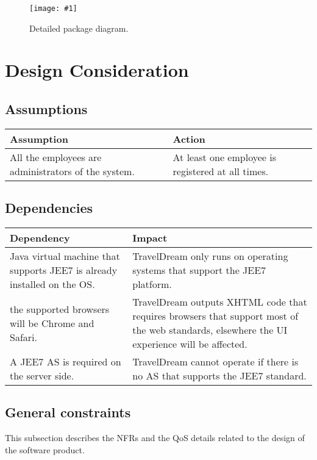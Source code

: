 \documentclass[a4paper,12pt]{book}
\newcommand{\insimg}[3]{
  \begin{figure}[H]
    \begin{center}
      \texttt{[image: \#1]}
    \end{center}
    \caption{#2}
    \label{fig:#1}
  \end{figure}
}
\begin{document}
\insimg{detailed-package}{Detailed package diagram.}{0.4}

\chapter{Design Consideration}

\section{Assumptions}

\begin{center}
  \begin{tabular}{ | p{5cm} | p{10cm} | }
    \hline
    \textbf{Assumption} & \textbf{Action} \\ \hline
    All the employees are administrators of the system. & At least one employee is registered at all times. \\ \hline
  \end{tabular}
\end{center}

\section{Dependencies}
\begin{center}
  \begin{tabular}{ | p{5cm} | p{10cm} | }
    \hline
    \textbf{Dependency} & \textbf{Impact} \\ \hline
    Java virtual machine that supports JEE7 is already installed on the OS. & TravelDream only runs on operating systems that support the JEE7 platform. \\ \hline
    the supported browsers will be Chrome and Safari. & TravelDream outputs XHTML code that requires browsers that support most of the web standards, elsewhere the UI experience will be affected. \\ \hline
    A JEE7 AS is required on the server side. & TravelDream cannot operate if there is no AS that supports the JEE7 standard. \\ \hline
  \end{tabular}
\end{center}

\section{General constraints}
This subsection describes the NFRs and the QoS details related to the design of the software product.
\end{document}
